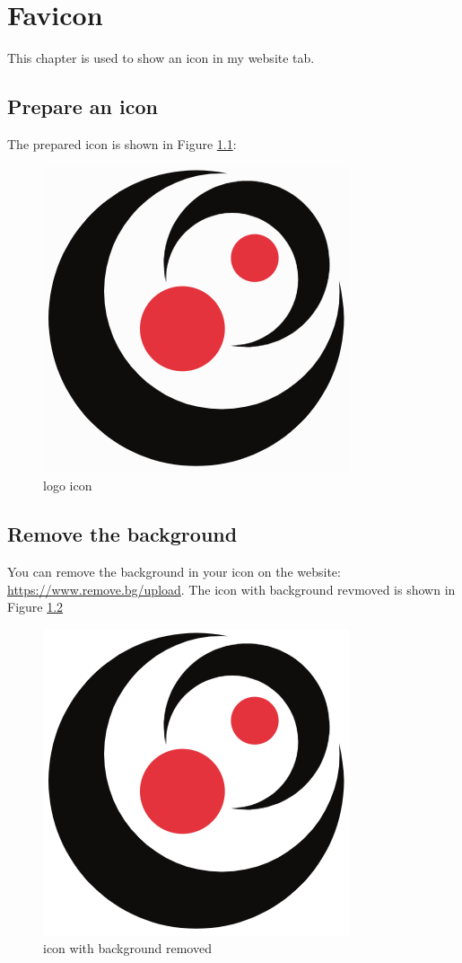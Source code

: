 
\chapter{Favicon}

This chapter is used to show an icon in my website tab.

\section{Prepare an icon}
The prepared icon is shown in Figure \ref{fig:logo}:

\begin{figure}[!ht]
  \centering
  \includegraphics{logo-same.png}
  \caption{logo icon}
  \label{fig:logo}
\end{figure}


\section{Remove the background}

You can remove the background in your icon on the website: \url{https://www.remove.bg/upload}.
The icon with background revmoved is shown in Figure \ref{fig:logo-no-background}

\begin{figure}[!ht]
  \centering
  \includegraphics{logo-no-background.png}
  \caption{icon with background removed}
  \label{fig:logo-no-background}
\end{figure}

